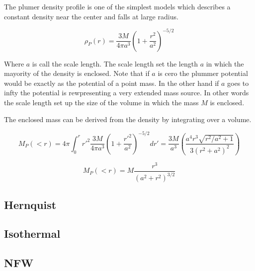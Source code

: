 \documentclass[12pt]{article}
\begin{document}
The plumer density profile is one of the simplest models which describes
a constant density near the center and falls at large radius.

\begin{equation}
\rho_P (r) = \frac{3M}{4\pi a^3} (1 + \frac{r^2}{a^2})^{-5/2}
\end{equation} 

Where $a$ is call the scale length. The scale length set the length $a$ in which the mayority of the density is enclosed. Note
that if $a$ is cero the plummer potential would be exactly as the potential of a point mass. 
In the other hand if $a$ goes to infty the potential is rewpresenting a very extended mass source.
In other words the scale length set up the size of the volume in which the mass $M$ is enclosed.

The enclosed mass can be derived from the density by integrating over a volume. 

\begin{equation}
M_P(<r) = 4 \pi \int_0^r r'^2\frac{3M}{4\pi a^3} (1 + \frac{r'^2}{a^2})^{-5/2} dr' = \frac{3M}{a^3} \left( \frac{a^4 r^3 \sqrt{r^2/a^2 + 1}}{3(r^2 + a^2)^2}  \right)
\end{equation}

\begin{equation}
M_P(<r) = M \frac{r^3}{(a^2+r^2)^{3/2}}
\end{equation}


\subsection{Hernquist}


\subsection{Isothermal}

\subsection{NFW}
\end{document}
